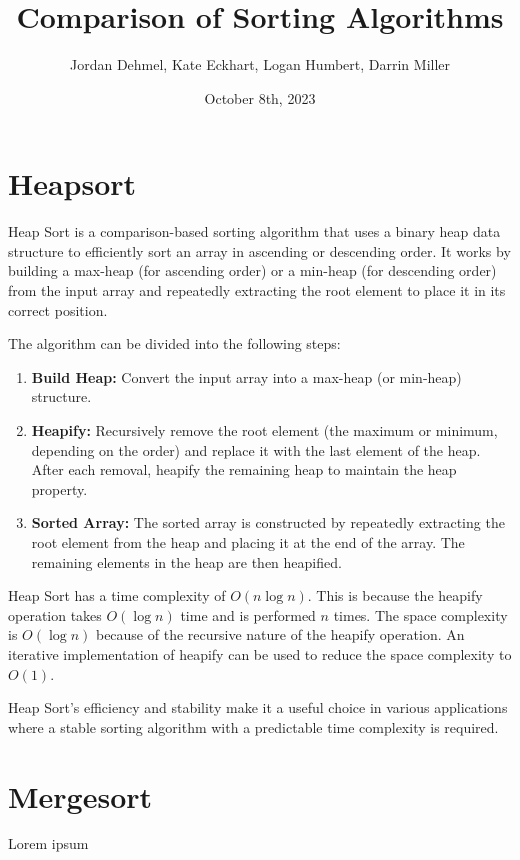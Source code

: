 \documentclass[12pt]{amsart}
\title{Comparison of Sorting Algorithms}
\author{Jordan Dehmel, Kate Eckhart, Logan Humbert, Darrin Miller}
\date{October 8th, 2023}
\begin{document}
\maketitle

\section{Heapsort}
Heap Sort is a comparison-based sorting algorithm that uses a binary heap data structure to efficiently sort an array in ascending or descending order. It works by building a max-heap (for ascending order) or a min-heap (for descending order) from the input array and repeatedly extracting the root element to place it in its correct position.
\newline

The algorithm can be divided into the following steps:

\begin{enumerate}
    \item \textbf{Build Heap:} Convert the input array into a max-heap (or min-heap) structure.
    \item \textbf{Heapify:} Recursively remove the root element (the maximum or minimum, depending on the order) and replace it with the last element of the heap. After each removal, heapify the remaining heap to maintain the heap property.
    \item \textbf{Sorted Array:} The sorted array is constructed by repeatedly extracting the root element from the heap and placing it at the end of the array. The remaining elements in the heap are then heapified.
\end{enumerate}

Heap Sort has a time complexity of $O(n \log n)$. This is because the heapify operation takes $O(\log n)$ time and is performed $n$ times.\newline
The space complexity is $O(\log n)$ because of the recursive nature of the heapify operation.
An iterative implementation of heapify can be used to reduce the space complexity to $O(1)$.
\newline

Heap Sort's efficiency and stability make it a useful choice in various applications where a stable sorting algorithm with a predictable time complexity is required.

\section{Mergesort}
    Lorem ipsum
\end{document}
